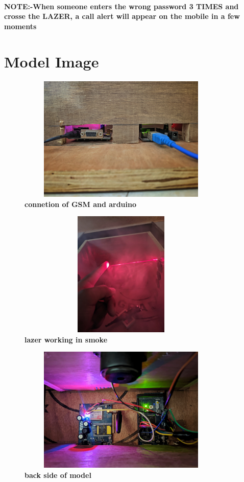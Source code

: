 \paragraph{}\textbf{\color{red}NOTE:-When someone enters the wrong password 3 TIMES and crosse the LAZER, a call alert will appear on the mobile in a few moments}
\section{Model Image}
\begin{figure}[H]
  \centering
    \includegraphics[height= 6cm, width=10cm]{project/images/img1}
    \caption{\textbf {connetion of GSM and arduino }}
\end{figure}
\begin{figure}[H]
  \centering
    \includegraphics[height= 6cm, width=10cm]{project/images/img2}
    \caption{\textbf {lazer working in smoke }}
\end{figure}
\begin{figure}[H]
  \centering
    \includegraphics[height= 6cm, width=10cm]{project/images/img3}
    \caption{\textbf {back side of model }}
\end{figure}

